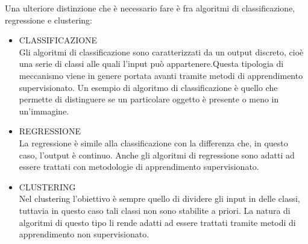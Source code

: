 Una ulteriore distinzione che è necessario fare è fra algoritmi di classificazione, regressione e clustering:
\begin{itemize}
	\item CLASSIFICAZIONE \\
	Gli algoritmi di classificazione sono caratterizzati da un output discreto, cioè una serie di classi alle quali l'input può appartenere.Questa tipologia di meccanismo viene in genere portata avanti tramite metodi di apprendimento supervisionato. Un esempio di algoritmo di classificazione è quello che permette di distinguere se un particolare oggetto è presente o meno in un'immagine.
	\item REGRESSIONE \\
	La regressione è simile alla classificazione con la differenza che, in questo caso, l'output è continuo. Anche gli algoritmi di regressione sono adatti ad essere trattati con metodologie di apprendimento supervisionato.
	\item CLUSTERING \\
	Nel clustering l'obiettivo è sempre quello di dividere gli input in delle classi, tuttavia in questo caso tali classi non sono stabilite a priori. La natura di algoritmi di questo tipo li rende adatti ad essere trattati tramite metodi di apprendimento non supervisionato.
\end{itemize}

